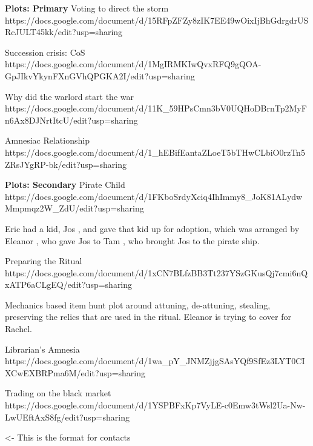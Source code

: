 \documentclass[char]{GL2020}
\begin{document}
\textbf{Plots: Primary}
Voting to direct the storm
https://docs.google.com/document/d/15RFpZFZy8zIK7EE49wOixIjBhGdrgdrUSRcJULT45kk/edit?usp=sharing

Succession crisis: CoS
https://docs.google.com/document/d/1MgIRMKIwQvxRFQ9gQOA-GpJIkvYkynFXnGVhQPGKA2I/edit?usp=sharing

Why did the warlord start the war
https://docs.google.com/document/d/11K_59HPsCmn3bV0UQHoDBrnTp2MyFn6Ax8DJNrtItcU/edit?usp=sharing

Amnesiac Relationship
https://docs.google.com/document/d/1_hEBifEantaZLoeT5bTHwCLbiO0rzTn5ZRsJYgRP-bk/edit?usp=sharing

\textbf{Plots: Secondary}
Pirate Child
https://docs.google.com/document/d/1FKboSrdyXciq4IhImmy8_JoK81ALydwMmpmqz2W_ZdU/edit?usp=sharing

Eric \cEvil{} had a kid, Jos \cPirateChild{}, and gave that kid up for adoption, which was arranged by Eleanor \cEthics{}, who gave Jos \cPirateChild{} to Tam \cPirate{}, who brought Jos \cPirateChild{} to the pirate ship.


Preparing the Ritual
https://docs.google.com/document/d/1xCN7BLfzBB3Tt237YSzGKusQj7cmi6nQxATP6aCLgEQ/edit?usp=sharing

Mechanics based item hunt plot around attuning, de-attuning, stealing, preserving the relics that are used in the ritual.  Eleanor is trying to cover for Rachel.

Librarian's Amnesia
https://docs.google.com/document/d/1wa_pY_JNMZjjgSAsYQf9SfEz3LYT0CIXCwEXBRPma6M/edit?usp=sharing

Trading on the black market
https://docs.google.com/document/d/1YSPBFxKp7VyLE-c0Emw3tWsl2Ua-Nw-LwUEftAxS8fg/edit?usp=sharing

\begin{itemz}[Goals]
	\item 
\end{itemz}

\begin{itemz}[Notes]
	\item 
\end{itemz}

\begin{contacts}
	\contact{\cTest{}} <- This is the format for contacts 
\end{contacts}
\end{document}
